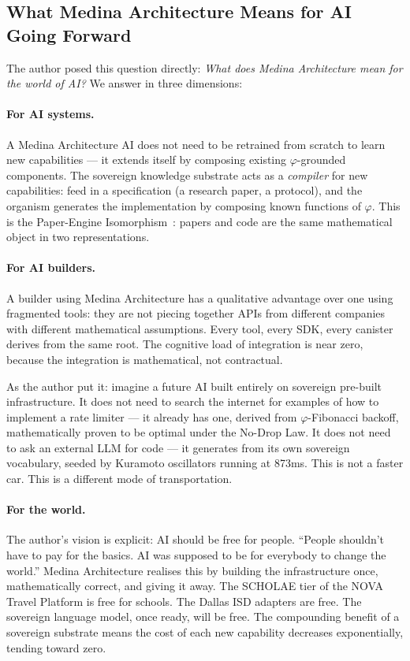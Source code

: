 \documentclass[12pt]{article}
\newcommand{\PHI}{\varphi}
\begin{document}
\subsection{What Medina Architecture Means for AI Going Forward}

The author posed this question directly: \emph{What does Medina Architecture
mean for the world of AI?}  We answer in three dimensions:

\paragraph{For AI systems.}
A Medina Architecture AI does not need to be retrained from scratch to learn
new capabilities — it extends itself by composing existing $\PHI$-grounded
components.  The sovereign knowledge substrate acts as a \emph{compiler} for
new capabilities: feed in a specification (a research paper, a protocol), and
the organism generates the implementation by composing known functions of $\PHI$.
This is the Paper-Engine Isomorphism~\cite{medina2026paperengine}: papers and
code are the same mathematical object in two representations.

\paragraph{For AI builders.}
A builder using Medina Architecture has a qualitative advantage over one using
fragmented tools: they are not piecing together APIs from different companies
with different mathematical assumptions.  Every tool, every SDK, every canister
derives from the same root.  The cognitive load of integration is near zero,
because the integration is mathematical, not contractual.

As the author put it: imagine a future AI built entirely on sovereign pre-built
infrastructure.  It does not need to search the internet for examples of how
to implement a rate limiter — it already has one, derived from $\PHI$-Fibonacci
backoff, mathematically proven to be optimal under the No-Drop Law.  It does not
need to ask an external LLM for code — it generates from its own sovereign
vocabulary, seeded by Kuramoto oscillators running at 873ms.  This is not a
faster car.  This is a different mode of transportation.

\paragraph{For the world.}
The author's vision is explicit: AI should be free for people.
``People shouldn't have to pay for the basics.  AI was supposed to be for
everybody to change the world.''  Medina Architecture realises this by building
the infrastructure once, mathematically correct, and giving it away.
The SCHOLAE tier of the NOVA Travel Platform is free for schools.
The Dallas ISD adapters are free.  The sovereign language model, once ready,
will be free.  The compounding benefit of a sovereign substrate means the cost
of each new capability decreases exponentially, tending toward zero.
\end{document}

